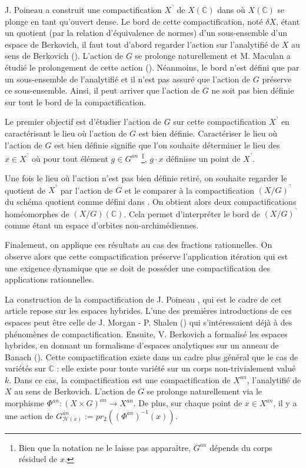 \documentclass[11pt]{article}
\newcommand{\C}{\mathbb{C}}
\newcommand{\h}{\mathcal{H}}
\begin{document}
J. Poineau a construit une compactification $X^\urcorner$ de $X(\C)$ dans \cite{PoineauCompactificationHybride} où $X(\C)$ se plonge en tant qu'ouvert dense. Le bord de cette compactification, noté $\delta X$, étant un quotient (par la relation d'équivalence de normes) d'un sous-ensemble d'un espace de Berkovich, il faut tout d'abord regarder l'action sur l'analytifié de $X$ au sens de Berkovich (\cite{BerkovichLivre}). L'action de $G$ se prolonge naturellement et M. Maculan a étudié le prolongement de cette action (\cite{MaculanGIT}). Néanmoins, le bord n'est défini que par un sous-ensemble de l'analytifié et il n'est pas assuré que l'action de $G$ préserve ce sous-ensemble. Ainsi, il peut arriver que l'action de $G$ ne soit pas bien définie sur tout le bord de la compactification. 

Le premier objectif est d'étudier l'action de $G$ sur cette compactification $X^\urcorner$ en caractérisant le lieu où l'action de $G$ est bien définie. Caractériser le lieu où l'action de $G$ est bien définie signifie que l'on souhaite déterminer le lieu des $x\in X^\urcorner$ où pour tout élément $g\in G^{an}$ \footnote{Bien que la notation ne le laisse pas apparaître, $G^{an}$ dépends du corps résiduel de $x$.}, $g\cdot x$ définisse un point de $X^\urcorner$.

Une fois le lieu où l'action n'est pas bien définie retiré, on souhaite regarder le quotient de $X^\urcorner$ par l'action de $G$ et le comparer à la compactification $(X/G)^\urcorner$ du schéma quotient comme défini dans \cite{GIT}. On obtient alors deux compactifications homéomorphes de $(X/G)(\C)$. Cela permet d'interpréter le bord de $(X/G)^\urcorner$ comme étant un espace d'orbites non-archimédiennes.

Finalement, on applique ces résultats au cas des fractions rationnelles. On observe alors que cette compactification préserve l'application itération qui est une exigence dynamique que se doit de posséder une compactification des applications rationnelles.

\bigskip 

La construction de la compactification de J. Poineau \cite{PoineauCompactificationHybride}, qui est le cadre de cet article repose sur les espaces hybrides. L'une des premières introductions de ces espaces peut être celle de J. Morgan - P. Shalen (\cite{MorganShalenIntroEspacesHybrides}) qui s'intéressaient déjà à des phénomènes de compactification. Ensuite, V. Berkovich a formalisé les espaces hybrides, en donnant un formalisme d'espaces analytiques sur un anneau de Banach (\cite{BerkovichLivre}). Cette compactification existe dans un cadre plus général que le cas de variétés sur $\C$ : elle existe pour toute variété sur un corps non-trivialement valué $k$. Dans ce cas, la compactification est une compactification de $X^{an}$, l'analytifié de $X$ au sens de Berkovich. L'action de $G$ se prolonge naturellement via le morphisme $\Phi^{an} : (X\times G)^{an} \rightarrow X^{an}$. De plus, sur chaque point de $x \in X^{an}$, il y a une action de $G^{an}_{\h(x)} := pr_2((\Phi^{an})^{-1}(x))$.
\end{document}
